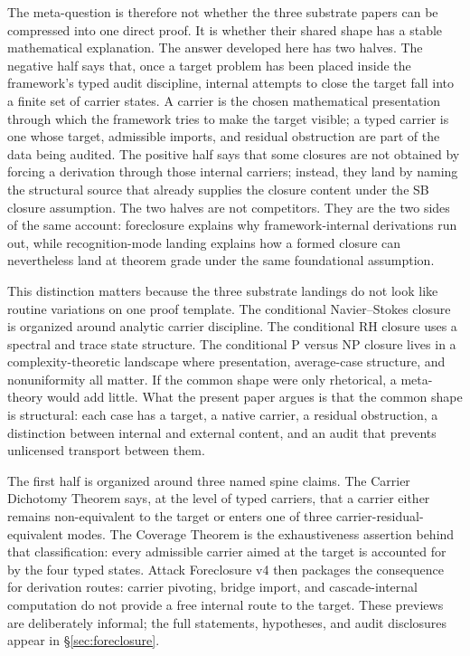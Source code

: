 \documentclass[11pt]{article}
\theoremstyle{definition}
\begin{document}
The meta-question is therefore not whether the three substrate
papers can be compressed into one direct proof.  It is whether their
shared shape has a stable mathematical explanation.  The answer
developed here has two halves.  The negative half says that, once a
target problem has been placed inside the framework's typed audit
discipline, internal attempts to close the target fall into a finite
set of carrier states.  A carrier is the chosen mathematical
presentation through which the framework tries to make the target
visible; a typed carrier is one whose target, admissible imports, and
residual obstruction are part of the data being audited.  The positive
half says that some closures are not obtained by forcing a derivation
through those internal carriers; instead, they land by naming the
structural source that already supplies the closure content under the
SB closure assumption.  The two halves are not competitors.  They are
the two sides of the same account: foreclosure explains why
framework-internal derivations run out, while recognition-mode landing
explains how a formed closure can nevertheless land at theorem grade
under the same foundational assumption.

This distinction matters because the three substrate landings do not
look like routine variations on one proof template.  The conditional
Navier--Stokes closure is organized around analytic carrier
discipline.  The conditional RH closure uses a spectral and trace
state structure.  The conditional P versus NP closure lives in a
complexity-theoretic landscape where presentation, average-case
structure, and nonuniformity all matter.  If the common shape were
only rhetorical, a meta-theory would add little.  What the present
paper argues is that the common shape is structural: each case has a
target, a native carrier, a residual obstruction, a distinction
between internal and external content, and an audit that prevents
unlicensed transport between them.

The first half is organized around three named spine claims.  The
Carrier Dichotomy Theorem says, at the level of typed carriers, that
a carrier either remains non-equivalent to the target or enters one
of three carrier-residual-equivalent modes.  The Coverage Theorem is
the exhaustiveness assertion behind that classification: every
admissible carrier aimed at the target is accounted for by the four
typed states.  Attack Foreclosure v4 then packages the consequence
for derivation routes: carrier pivoting, bridge import, and
cascade-internal computation do not provide a free internal route to
the target.  These previews are deliberately informal; the full
statements, hypotheses, and audit disclosures appear in
\S\ref{sec:foreclosure}.
\end{document}
